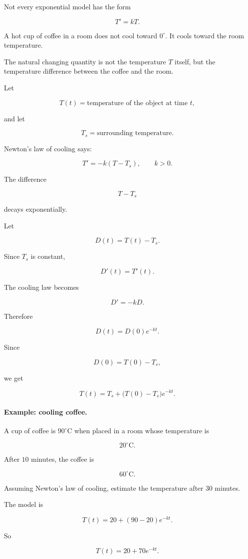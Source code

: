 Not every exponential model has the form

\[
T'=kT.
\]

A hot cup of coffee in a room does not cool toward \(0^\circ\).  It cools toward the
room temperature.

The natural changing quantity is not the temperature \(T\) itself, but the temperature
difference between the coffee and the room.

Let

\[
T(t)=\text{temperature of the object at time }t,
\]

and let

\[
T_s=\text{surrounding temperature}.
\]

Newton's law of cooling says:

\[
\boxed{
T'=-k(T-T_s),
\qquad k>0.
}
\]

The difference

\[
T-T_s
\]

decays exponentially.

Let

\[
D(t)=T(t)-T_s.
\]

Since \(T_s\) is constant,

\[
D'(t)=T'(t).
\]

The cooling law becomes

\[
D'=-kD.
\]

Therefore

\[
D(t)=D(0)e^{-kt}.
\]

Since

\[
D(0)=T(0)-T_s,
\]

we get

\[
\boxed{
T(t)=T_s+\bigl(T(0)-T_s\bigr)e^{-kt}.
}
\]

\paragraph{Example: cooling coffee.}
A cup of coffee is \(90^\circ\text{C}\) when placed in a room whose temperature is

\[
20^\circ\text{C}.
\]

After \(10\) minutes, the coffee is

\[
60^\circ\text{C}.
\]

Assuming Newton's law of cooling, estimate the temperature after \(30\) minutes.

The model is

\[
T(t)=20+(90-20)e^{-kt}.
\]

So

\[
T(t)=20+70e^{-kt}.
\]

